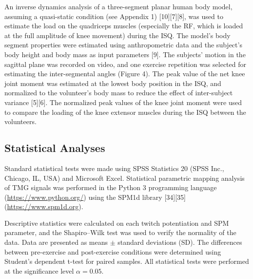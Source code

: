\documentclass[utf8]{style/FrontiersinHarvard}
\begin{document}
An inverse dynamics analysis of a three-segment planar human body model, assuming a quasi-static condition (see Appendix 1) [10][7][8], was used to estimate the load on the quadriceps muscles (especially the RF, which is loaded at the full amplitude of knee movement) during the ISQ.
The model's body segment properties were estimated using anthropometric data and the subject’s body height and body mass as input parameters [9].
The subjects' motion in the sagittal plane was recorded on video, and one exercise repetition was selected for estimating the inter-segmental angles (Figure 4).
The peak value of the net knee joint moment was estimated at the lowest body position in the ISQ,
and normalized to the volunteer’s body mass to reduce the effect of inter-subject variance [5][6].
The normalized peak values of the knee joint moment were used to compare the loading of the knee extensor muscles during the ISQ between the volunteers.

\subsection{Statistical Analyses}
Standard statistical tests were made using SPSS Statistics 20 (SPSS Inc., Chicago, IL, USA) and Microsoft Excel.
Statistical parametric mapping analysis of TMG signals was performed in the Python 3 programming language (\url{https://www.python.org/})
using the SPM1d library [34][35] (\url{https://www.spm1d.org}).


Descriptive statistics were calculated on each twitch potentiation and SPM parameter, and the Shapiro–Wilk test was used to verify the normality of the data.
Data are presented as means $ \pm $ standard deviations (SD).
The differences between pre-exercise and post-exercise conditions were determined using Student’s dependent t-test for paired samples.
All statistical tests were performed at the significance level $ \alpha = 0.05 $.
\end{document}
